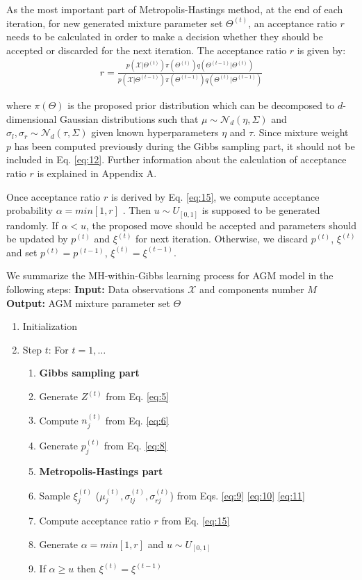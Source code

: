 \documentclass[conference]{llncs}
\begin{document}
As the most important part of Metropolis-Hastings method, at the end of each iteration, for new generated mixture parameter set $\Theta^{(t)}$, an acceptance ratio $r$ needs to be calculated in order to make a decision whether they should be accepted or discarded for the next iteration. The acceptance ratio $r$ is given by:
\begin{align}
r = \frac{p(\mathcal{X}|\Theta^{(t)})\pi(\Theta^{(t)})q(\Theta^{(t-1)}|\Theta^{(t)})}{p(\mathcal{X}|\Theta^{(t-1)})\pi(\Theta^{(t-1)})q(\Theta^{(t)}|\Theta^{(t-1)})}
\label{eq:12}
\end{align}

where $\pi(\Theta)$ is the proposed prior distribution which can be decomposed to $d$-dimensional Gaussian distributions such that $\mu \sim \mathcal{N}_d(\eta,\Sigma)$ and $\sigma_l, \sigma_r \sim \mathcal{N}_d(\tau,\Sigma)$ given known hyperparameters $\eta$ and $\tau$. Since mixture weight $p$ has been computed previously during the Gibbs sampling part, it should not be included in Eq. \eqref{eq:12}. Further information about the calculation of acceptance ratio $r$ is explained in Appendix A.

Once acceptance ratio $r$ is derived by Eq. \eqref{eq:15}, we compute acceptance probability $\alpha = min[1,r]$ \cite{Luengo2013}. Then $u \sim U_{[0,1]}$ is supposed to be generated randomly. If $\alpha < u$, the proposed move should be accepted and parameters should be updated by $p^{(t)}$ and $\xi^{(t)}$ for next iteration. Otherwise, we discard $p^{(t)}$, $\xi^{(t)}$ and set $p^{(t)} = p^{(t-1)}$, $\xi^{(t)} = \xi^{(t-1)}$.

We summarize the MH-within-Gibbs learning process for AGM model in the following steps:
\bigbreak
\noindent\textbf{Input:} Data observations $\mathcal{X}$ and components number $M$ \\
\textbf{Output:} AGM mixture parameter set $\Theta$
\bigbreak

\begin{enumerate}
\item Initialization
\item Step $t$: For $t = 1,\ldots$
\begin{enumerate}
\item[]\textbf{Gibbs sampling part}
\item Generate $Z^{(t)}$ from Eq. \eqref{eq:5}
\item Compute $n_j^{(t)}$ from Eq. \eqref{eq:6}
\item Generate $p_j^{(t)}$ from Eq. \eqref{eq:8}
\item[] \textbf{Metropolis-Hastings part}
\item Sample $\xi_j^{(t)}$ ($\mu_j^{(t)}, \sigma_{lj}^{(t)}, \sigma_{rj}^{(t)}$) from Eqs. \eqref{eq:9} \eqref{eq:10} \eqref{eq:11}
\item Compute acceptance ratio $r$ from Eq. \eqref{eq:15}
\item Generate $\alpha = min[1,r]$ and $u \sim U_{[0,1]}$
\item If $\alpha \geq u$ then $\xi^{(t)} = \xi^{(t-1)}$
\end{enumerate}
\end{enumerate}
\bigskip
\end{document}
